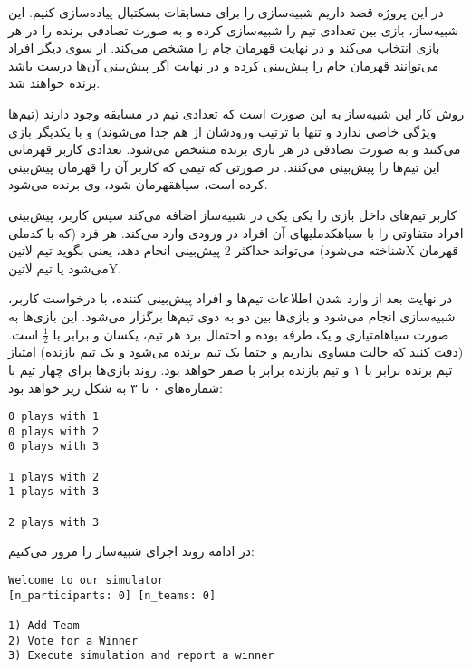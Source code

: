 

در این پروژه قصد داریم شبیه‌سازی را برای مسابقات بسکتبال پیاده‌سازی کنیم.
این شبیه‌ساز، بازی بین تعدادی تیم را شبیه‌سازی کرده و به صورت تصادفی برنده را در
هر بازی انتخاب می‌کند و در نهایت قهرمان جام را مشخص می‌کند.
از سوی دیگر افراد می‌توانند قهرمان جام را پیش‌بینی کرده و در نهایت اگر پیش‌بینی آن‌ها
درست باشد برنده خواهند شد.


روش کار این شبیه‌ساز به این صورت است که تعدادی تیم در مسابقه وجود دارند (تیم‌ها ویژگی خاصی ندارد و تنها با ترتیب ورودشان از هم جدا می‌شوند)
و با یکدیگر بازی می‌کنند و به صورت تصادفی در هر بازی برنده مشخص می‌شود. تعدادی کاربر قهرمانی این تیم‌ها را پیش‌بینی می‌کنند.
در صورتی که تیمی که کاربر آن را قهرمان پیش‌بینی کرده است، ‌سیاه{قهرمان} شود، وی برنده می‌شود.

کاربر تیم‌های داخل بازی را یکی یکی در شبیه‌ساز اضافه می‌کند
سپس کاربر، پیش‌بینی افراد متفاوتی را با ‌سیاه{کدملی}های آن افراد در ورودی وارد می‌کند.
هر فرد (که با کدملی شناخته می‌شود) می‌تواند حداکثر 2 پیش‌بینی انجام دهد،
یعنی بگوید تیم ‌لاتین{X} قهرمان می‌شود یا تیم ‌لاتین{Y}.

در نهایت بعد از وارد شدن اطلاعات تیم‌ها و افراد پیش‌بینی کننده، با درخواست کاربر، شبیه‌سازی انجام می‌شود و
بازی‌ها بین دو به دوی تیم‌ها برگزار می‌شود.
این بازی‌ها به صورت
‌سیاه{امتیازی و یک طرفه}
بوده و احتمال برد هر تیم‌، یکسان و برابر با
\(\frac{1}{2}\)
است. 
(دقت کنید که حالت مساوی نداریم و حتما یک تیم برنده می‌شود و یک تیم بازنده)
امتیاز تیم برنده برابر با ۱ و تیم بازنده برابر با صفر خواهد بود.
روند بازی‌ها برای چهار تیم با شماره‌های ۰ تا ۳ به شکل زیر خواهد بود:

\begin{latin}
\begin{verbatim}
0 plays with 1
0 plays with 2
0 plays with 3

1 plays with 2
1 plays with 3

2 plays with 3
\end{verbatim}
\end{latin}


در ادامه روند اجرای شبیه‌ساز را مرور می‌کنیم:

\begin{latin}
\begin{verbatim}
Welcome to our simulator
[n_participants: 0] [n_teams: 0]

1) Add Team
2) Vote for a Winner
3) Execute simulation and report a winner
\end{verbatim}
\end{latin}


